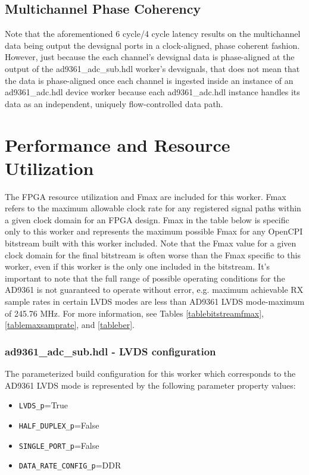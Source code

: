 \documentclass{article}
\def\comp{ad9361\_adc\_sub}
\edef\ecomp{ad9361_adc_sub}
\begin{document}
\subsection*{Multichannel Phase Coherency}
Note that the aforementioned 6 cycle/4 cycle latency results on the multichannel data being output the devsignal ports in a clock-aligned, phase coherent fashion. However, just because the each channel's devsignal data is phase-aligned at the output of the \comp{}.hdl worker's devsignals, that does not mean that the data is phase-aligned once each channel is ingested inside an instance of an ad9361\_adc.hdl device worker because each ad9361\_adc.hdl instance handles its data as an independent, uniquely flow-controlled data path.

\pagebreak
\section*{Performance and Resource Utilization}
\noindent
The FPGA resource utilization and Fmax are included for this worker. Fmax refers to the maximum allowable clock rate for any registered signal paths within a given clock domain for an FPGA design. Fmax in the table below is specific only to this worker and represents the maximum possible Fmax for any OpenCPI bitstream built with this worker included. Note that the Fmax value for a given clock domain for the final bitstream is often worse than the Fmax specific to this worker, even if this worker is the only one included in the bitstream. It's important to note that the full range of possible operating conditions for the AD9361 is not guaranteed to operate without error, e.g. maximum achievable RX sample rates in certain LVDS modes are less than AD9361 LVDS mode-maximum of 245.76 MHz\cite{adi_ug570}. For more information, see Tables \ref{tablebitstreamfmax}, \ref{tablemaxsamprate}, and \ref{tableber}.

\subsubsection*{\comp.hdl - LVDS configuration}

The parameterized build configuration for this worker which corresponds to the AD9361 LVDS mode is represented by the following parameter property values:
%
\begin{itemize}
	\item \verb+LVDS_p+=True
	\item \verb+HALF_DUPLEX_p+=False
	\item \verb+SINGLE_PORT_p+=False
	\item \verb+DATA_RATE_CONFIG_p+=DDR
\end{itemize}
\end{document}
